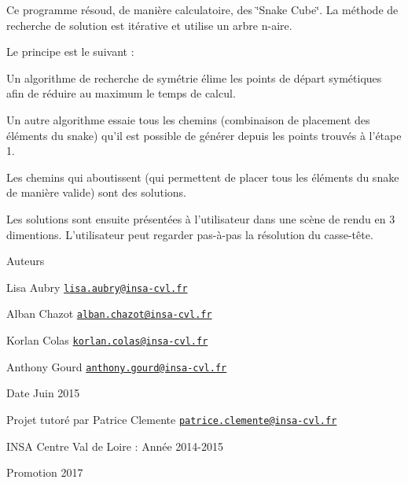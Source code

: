 Ce programme résoud, de manière calculatoire, des \char`\"{}\-Snake Cube\char`\"{}. La méthode de recherche de solution est itérative et utilise un arbre n-\/aire.

Le principe est le suivant \-:
\begin{DoxyEnumerate}
\item Un algorithme de recherche de symétrie élime les points de départ symétiques afin de réduire au maximum le temps de calcul.
\item Un autre algorithme essaie tous les chemins (combinaison de placement des éléments du snake) qu'il est possible de générer depuis les points trouvés à l'étape 1.
\item Les chemins qui aboutissent (qui permettent de placer tous les éléments du snake de manière valide) sont des solutions.
\item Les solutions sont ensuite présentées à l'utilisateur dans une scène de rendu en 3 dimentions. L'utilisateur peut regarder pas-\/à-\/pas la résolution du casse-\/tête.
\end{DoxyEnumerate}

\begin{DoxyAuthor}{Auteurs}

\begin{DoxyItemize}
\item Lisa Aubry \href{mailto:lisa.aubry@insa-cvl.fr}{\tt lisa.\-aubry@insa-\/cvl.\-fr}
\item Alban Chazot \href{mailto:alban.chazot@insa-cvl.fr}{\tt alban.\-chazot@insa-\/cvl.\-fr}
\item Korlan Colas \href{mailto:korlan.colas@insa-cvl.fr}{\tt korlan.\-colas@insa-\/cvl.\-fr}
\item Anthony Gourd \href{mailto:anthony.gourd@insa-cvl.fr}{\tt anthony.\-gourd@insa-\/cvl.\-fr} 
\end{DoxyItemize}
\end{DoxyAuthor}
\begin{DoxyDate}{Date}
Juin 2015
\end{DoxyDate}
Projet tutoré par Patrice Clemente \href{mailto:patrice.clemente@insa-cvl.fr}{\tt patrice.\-clemente@insa-\/cvl.\-fr}

I\-N\-S\-A Centre Val de Loire \-: Année 2014-\/2015

Promotion 2017 